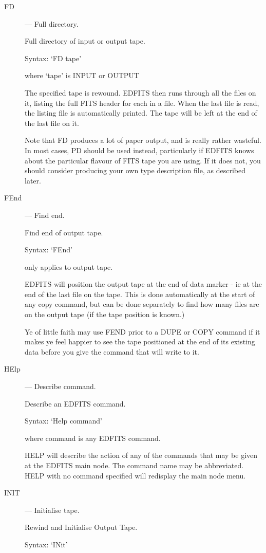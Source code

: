 \begin{description}
\item [FD] --- Full directory.

Full directory of input or output tape.

Syntax:  `FD  tape'

where `tape' is INPUT or OUTPUT

The specified tape is rewound.  EDFITS then runs through all the
files on it, listing the full FITS header for each in a file.  When
the last file is read, the listing file is automatically printed.
The tape will be left at the end of the last file on it.

Note that FD produces a lot of paper output, and is really rather
wasteful.  In most cases, PD should be used instead, particularly if
EDFITS knows about the particular flavour of FITS tape you are using.
If it does not, you should consider producing your own type description
file, as described later.

\item [FEnd] --- Find end.

Find end of output tape.

Syntax:   `FEnd'

only applies to output tape.

EDFITS will position the output tape at the end of data marker - ie
at the end of the last file on the tape.  This is done automatically
at the start of any copy command, but can be done separately to find
how many files are on the output tape (if the tape position is known.)

Ye of little faith may use FEND prior to a DUPE or COPY command if it
makes ye feel happier to see the tape positioned at the end of its
existing data before you give the command that will write to it.

\item [HElp] --- Describe command.

Describe an EDFITS command.

Syntax:  `Help command'

where command is any EDFITS command.

HELP will describe the action of any of the commands that may be
given at the EDFITS main node.  The command name may be abbreviated.
HELP with no command specified will redisplay the main node menu.

\item [INIT] --- Initialise tape.

Rewind and Initialise Output Tape.

Syntax:  `INit'


\end{description}
